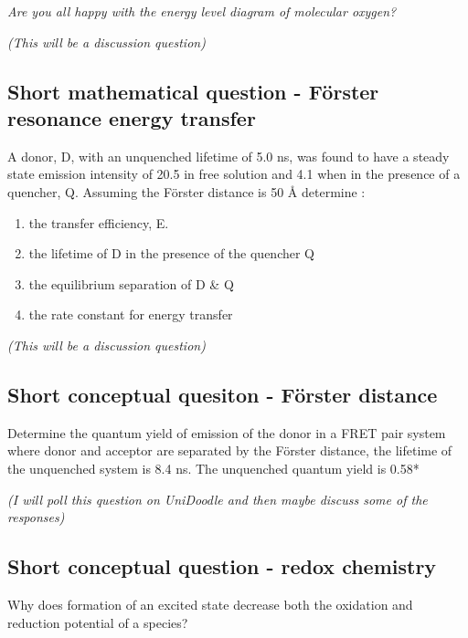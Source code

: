 \documentclass[
]{book}
\providecommand{\tightlist}{%
  \setlength{\itemsep}{0pt}\setlength{\parskip}{0pt}}
\begin{document}
\emph{Are you all happy with the energy level diagram of molecular oxygen?}

\emph{(This will be a discussion question)}

\hypertarget{sec:FRET}{%
\subsection{Short mathematical question - Förster resonance energy transfer}\label{sec:FRET}}

A donor, D, with an unquenched lifetime of 5.0 ns, was found to have a steady state emission intensity of 20.5 in free solution and 4.1 when in the presence of a quencher, Q. Assuming the Förster distance is 50 Å determine :

\begin{enumerate}
\def\labelenumi{\arabic{enumi}.}
\tightlist
\item
  the transfer efficiency, E.
\item
  the lifetime of D in the presence of the quencher Q
\item
  the equilibrium separation of D \& Q
\item
  the rate constant for energy transfer
\end{enumerate}

\emph{(This will be a discussion question)}

\hypertarget{sec:FRETdist}{%
\subsection{Short conceptual quesiton - Förster distance}\label{sec:FRETdist}}

Determine the quantum yield of emission of the donor in a FRET pair system where donor and acceptor are separated by the Förster distance, the lifetime of the unquenched system is 8.4 ns. The unquenched quantum yield is 0.58*

\emph{(I will poll this question on UniDoodle and then maybe discuss some of the responses)}

\hypertarget{short-conceptual-question---redox-chemistry}{%
\subsection{Short conceptual question - redox chemistry}\label{short-conceptual-question---redox-chemistry}}

Why does formation of an excited state decrease both the oxidation and reduction potential of a species?
\end{document}
